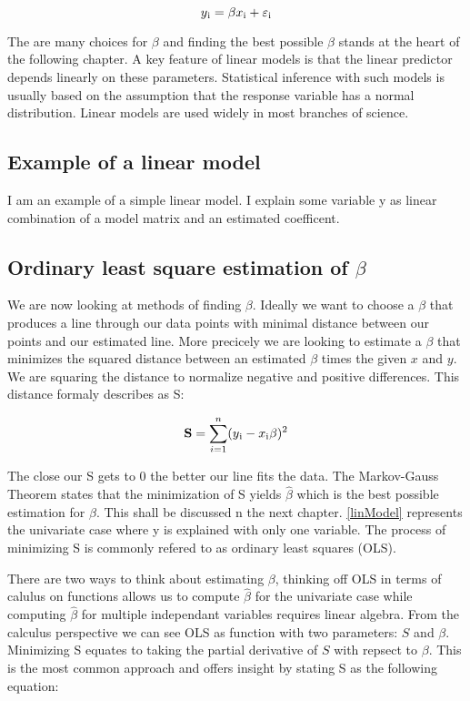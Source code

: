\documentclass{article}
\begin{document}
    \begin{equation}  \label{linModel} y\textsubscript{i} = \beta x\textsubscript{i} + \varepsilon\textsubscript{i} \end{equation}

    The are many choices for $\beta$ and finding the best possible $\beta$ stands at the heart of the following chapter. A key feature of linear models is that the linear predictor depends linearly on these parameters. Statistical inference with such models is usually based on the assumption that the response variable has a normal distribution. Linear models are used widely in most branches of science.

    \subsection{Example of a linear model}
    I am an example of a simple linear model. I explain some variable y as linear combination of a model matrix and an estimated coefficent.

    \subsection{Ordinary least square estimation of $\beta$}

    We are now looking at methods of finding $\beta$. Ideally we want to choose a $\beta$ that produces a line through our data points with minimal distance between our points and our estimated line. More precicely we are looking to estimate a $\beta$ that minimizes the squared distance between an estimated $\beta$ times the given $x$ and $y$. We are squaring the distance to normalize negative and positive differences. This distance formaly describes as S:

    \begin{equation} \label{sumSquares} \mathbf{S} =  \sum_{i=1}^{n}(y\textsubscript{i} - x\textsubscript{i}\beta)^{2} \end{equation}

    The close our S gets to 0 the better our line fits the data. The  Markov-Gauss Theorem states that the minimization of S yields $\widehat{\beta}$ which is the best possible estimation for $\beta$. This shall be discussed n the next chapter. \ref{linModel} represents the univariate case where y is explained with only one variable. The process of minimizing S is commonly refered to as ordinary least squares (OLS).

    There are two ways to think about estimating $\beta$, thinking off OLS in terms of calulus on functions allows us to compute $\widehat{\beta}$ for the univariate case while computing $\widehat{\beta}$ for multiple independant variables requires linear algebra. From the calculus perspective we can see OLS as function with two parameters: $S$ and $\beta$. Minimizing S equates to taking the partial derivative of $S$ with repsect to $\beta$. This is the most common approach and offers insight by stating S as the following equation:
\end{document}
